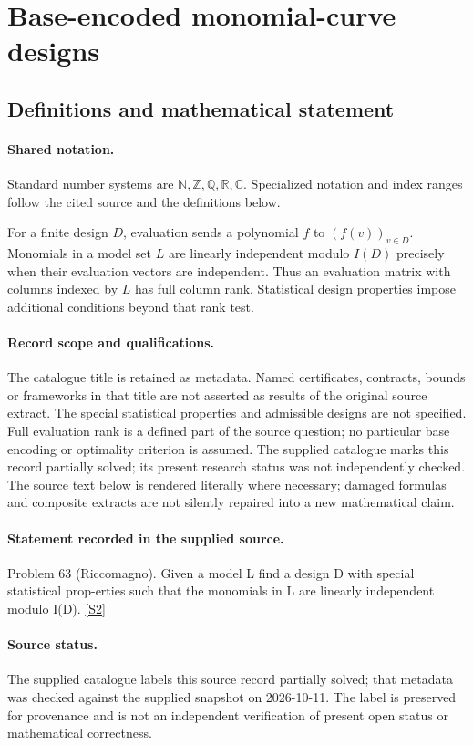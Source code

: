 \documentclass[11pt]{article}
\newcommand{\sref}[2]{\hyperlink{source:#1:#2}{[S#2]}}
\begin{document}
\section{Base-encoded monomial-curve designs}\label{statement}

\subsection{Definitions and mathematical statement}

\paragraph{Shared notation.}Standard number systems are $\mathbb N,\mathbb Z,\mathbb Q,\mathbb R,\mathbb C$. Specialized notation and index ranges follow the cited source and the definitions below.


For a finite design $D$, evaluation sends a polynomial $f$ to $(f(v))_{v\in D}$. Monomials in a model set $L$ are linearly independent modulo $I(D)$ precisely when their evaluation vectors are independent. Thus an evaluation matrix with columns indexed by $L$ has full column rank. Statistical design properties impose additional conditions beyond that rank test.
\paragraph{Record scope and qualifications.}
The catalogue title is retained as metadata. Named certificates, contracts, bounds or frameworks in that title are not asserted as results of the original source extract.
The special statistical properties and admissible designs are not specified. Full evaluation rank is a defined part of the source question; no particular base encoding or optimality criterion is assumed. The supplied catalogue marks this record partially solved; its present research status was not independently checked.
The source text below is rendered literally where necessary; damaged formulas and composite extracts are not silently repaired into a new mathematical claim.
\paragraph{Statement recorded in the supplied source.}
Problem 63 (Riccomagno). Given a model L find a design D with special statistical prop-erties such that the monomials in L are linearly independent modulo I(D). \sref{statement}{2}
\paragraph{Source status.}
The supplied catalogue labels this source record partially solved; that metadata was checked against the supplied snapshot on 2026-10-11. The label is preserved for provenance and is not an independent verification of present open status or mathematical correctness.
\end{document}
